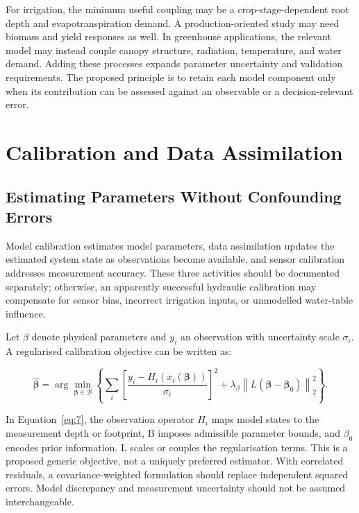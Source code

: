 \documentclass[acmsmall,screen,nonacm]{acmart}
\begin{document}
For irrigation, the minimum useful coupling may be a crop-stage-dependent root depth and evapotranspiration demand. A production-oriented study may need biomass and yield responses as well. In greenhouse applications, the relevant model may instead couple canopy structure, radiation, temperature, and water demand. Adding these processes expands parameter uncertainty and validation requirements. The proposed principle is to retain each model component only when its contribution can be assessed against an observable or a decision-relevant error.

\section{Calibration and Data Assimilation}

\label{sec:5}

\subsection{Estimating Parameters Without Confounding Errors}

\label{sec:5-1}

Model calibration estimates model parameters, data assimilation updates the estimated system state as observations become available, and sensor calibration addresses measurement accuracy. These three activities should be documented separately; otherwise, an apparently successful hydraulic calibration may compensate for sensor bias, incorrect irrigation inputs, or unmodelled water-table influence.

Let $\beta$ denote physical parameters and $y_{i}$ an observation with uncertainty scale $\sigma_{i}$. A regularised calibration objective can be written as:

\begin{equation}
\hat{\boldsymbol\beta}=\arg\min_{\boldsymbol\beta\in\mathcal B}\left\{\sum_i\left[\frac{y_i-H_i(x_i(\boldsymbol\beta))}{\sigma_i}\right]^2+\lambda_\beta\left\|L(\boldsymbol\beta-\boldsymbol\beta_0)\right\|_2^2\right\}.
\label{eq:7}
\end{equation}

In Equation~\eqref{eq:7}, the observation operator $H_{i}$ maps model states to the measurement depth or footprint, B imposes admissible parameter bounds, and $\beta_{0}$ encodes prior information. L scales or couples the regularisation terms. This is a proposed generic objective, not a uniquely preferred estimator. With correlated residuals, a covariance-weighted formulation should replace independent squared errors. Model discrepancy and measurement uncertainty should not be assumed interchangeable.
\end{document}

